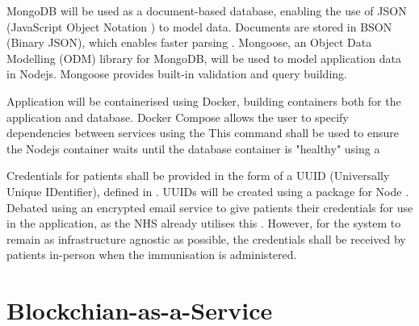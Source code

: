 


MongoDB will be used as a document-based database, enabling the use of JSON (JavaScript Object Notation \cite{noauthor_json_nodate}) to model data. 
Documents are stored in BSON (Binary JSON), which enables faster parsing \cite{noauthor_json_bson_nodate}. 
Mongoose, an Object Data Modelling (ODM) library for MongoDB, will be used to model application data in Nodejs. Mongoose provides built-in validation and query building. \cite{noauthor_mongoose_nodate} 

Application will be containerised using Docker, building containers both for the application and database. 
Docker Compose allows the user to specify dependencies between services using the %
This command shall be used to ensure the Nodejs container waits until the database container is "healthy" using a %

Credentials for patients shall be provided in the form of a UUID (Universally Unique IDentifier), defined in \cite{noauthor_rfc4122_nodate}.
UUIDs will be created using a package for Node \label{appendix:uuid}. 
Debated using an encrypted email service to give patients their credentials for use in the application, as the NHS already utilises this \cite{noauthor_guidance_nodate}. 
However, for the system to remain as infrastructure agnostic as possible, the credentials shall be received by patients in-person when the immunisation is administered.


\section{Blockchian-as-a-Service}


